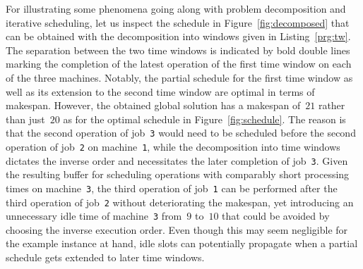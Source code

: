 \documentclass{tlp} %
\begin{document}
For illustrating some phenomena going along with problem decomposition
and iterative scheduling, let us inspect the schedule in Figure~\ref{fig:decomposed}
that can be obtained with the decomposition into windows given in Listing~\ref{prg:tw}.
The separation between the two time windows is indicated by bold double lines marking
the completion of the latest operation of the first time window on each of the three machines.
Notably, the partial schedule for the first time window as well as its extension to the
second time window are optimal in terms of makespan.
However, the obtained global solution has a makespan of~$21$ rather than just~$20$
as for the optimal schedule in Figure~\ref{fig:schedule}.
The reason is that the second operation of job~\lstinline{3} would need to be
scheduled before the second operation of job~\lstinline{2} on machine~\lstinline{1},
while the decomposition into time windows dictates the inverse order and necessitates
the later completion of job~\lstinline{3}.
Given the resulting buffer for scheduling operations with comparably short processing
times on machine~\lstinline{3},
the third operation of job~\lstinline{1} can be performed after the third operation
of job~\lstinline{2} without deteriorating the makespan,
yet introducing an unnecessary idle time of machine~\lstinline{3} from~$9$ to~$10$
that could be avoided by choosing the inverse execution order.
Even though this may seem negligible for the example instance at hand,
idle slots can potentially propagate when a partial schedule gets extended to later time windows.%
%
\end{document}
